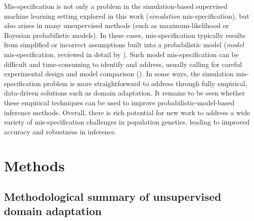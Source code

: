 Mis-specification is not only a problem in the simulation-based supervised machine learning setting explored in this work (\textit{simulation} mis-specification), but also arises in many unsupervised methods (such as maximum-likelihood or Bayesian probabilistic models). In these cases, mis-specification typically results from simplified or incorrect assumptions built into a probabilistic model (\textit{model} mis-specification, reviewed in detail by \cite{johri_recommendations_2022}). Such model mis-specification can be difficult and time-consuming to identify and address, usually calling for careful experimental design and model comparison (\cite{johri_recommendations_2022}). In some ways, the simulation mis-specification problem is more straightforward to address through fully empirical, data-driven solutions such as domain adaptation. It remains to be seen whether these empirical techniques can be used to improve probabilistic-model-based inference methods. Overall, there is rich potential for new work to address a wide variety of mis-specification challenges in population genetics, leading to improved accuracy and robustness in inference.

\section{Methods} \label{DA-methods}

\subsection{Methodological summary of unsupervised domain adaptation}

